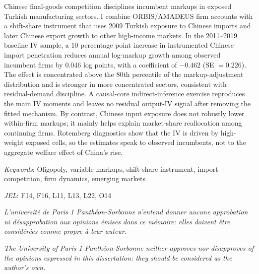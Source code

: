 ﻿\documentclass[12pt]{article}
\begin{document}
\begin{titlepage}
\begin{center}
\begin{minipage}{0.94\textwidth}
\smallskip

Chinese final-goods competition disciplines incumbent markups in exposed Turkish manufacturing sectors. I combine ORBIS/AMADEUS firm accounts with a shift-share instrument that uses 2009 Turkish exposure to Chinese imports and later Chinese export growth to other high-income markets. In the 2011--2019 baseline IV sample, a 10 percentage point increase in instrumented Chinese import penetration reduces annual log-markup growth among observed incumbent firms by 0.046 log points, with a coefficient of $-0.462$ (SE $=0.226$). The effect is concentrated above the 80th percentile of the markup-adjustment distribution and is stronger in more concentrated sectors, consistent with residual-demand discipline. A causal-core indirect-inference exercise reproduces the main IV moments and leaves no residual output-IV signal after removing the fitted mechanism. By contrast, Chinese input exposure does not robustly lower within-firm markups; it mainly helps explain market-share reallocation among continuing firms. Rotemberg diagnostics show that the IV is driven by high-weight exposed cells, so the estimates speak to observed incumbents, not to the aggregate welfare effect of China's rise.


\smallskip
\textit{Keywords}: Oligopoly, variable markups, shift-share instrument, import competition, firm dynamics, emerging markets

\smallskip
\textit{JEL}: F14, F16, L11, L13, L22, O14
\end{minipage}
\end{center}
\endgroup
\end{titlepage}

\newpage
\thispagestyle{empty}
\begin{center}
\bigskip\vspace*{6in}

\textit{L'universit\'{e} de Paris 1 Panth\'{e}on-Sorbonne n'entend donner aucune approbation
ni d\'{e}sapprobation aux opinions \'{e}mises dans ce m\'{e}moire: elles doivent \^{e}tre consid\'{e}r\'{e}es comme propre \`{a} leur auteur.}

\bigskip\vspace*{0.25in}

\textit{The University of Paris 1 Panth\'{e}on-Sorbonne neither approves nor
disapproves of the opinions expressed in this dissertation: they should be
considered as the author's own.}
\end{center}

\pagebreak%
\tableofcontents
\pagebreak%
\listoffigures
\pagebreak%
\listoftables
\pagebreak%
\onehalfspacing
\hypersetup{pageanchor=true}
\end{document}
